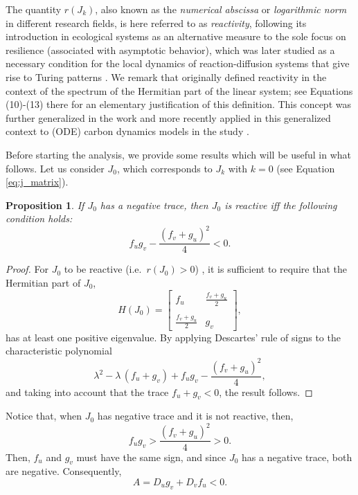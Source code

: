 \documentclass{article}
\newtheorem{proposition}{Proposition}
\newcommand{\jac}{J_{k}}
\begin{document}
 {The quantity $r(\jac)$, also known as the \textit{numerical abscissa} \cite{trefethen2005spectra} or \textit{logarithmic norm} \cite{moler2003nineteen} in different research fields, is here referred to as \textit{reactivity}, following its introduction in ecological systems \cite{neubert1997alternatives} as an alternative measure to the sole focus on resilience}
 (associated with asymptotic behavior), which was later studied as a necessary condition for the local dynamics of reaction-diffusion systems that give rise to Turing patterns \cite{NEUBERT2002}. {We remark that \cite{neubert1997alternatives} originally defined reactivity in the context of the spectrum of the Hermitian part of the linear system; see Equations (10)-(13) there for an elementary justification of this definition.} This concept was further generalized in the work \cite{mari2017generalized} and more recently applied in this generalized context to {(ODE)} carbon dynamics models in the study \cite{diele2023soc}.

Before starting the analysis, we provide some results 
 which will be useful in what follows. Let us consider $J_{0}$, which corresponds to $\jac$ with ${k} ={0}$ ({see Equation \ref{eq:j_matrix}}).
\begin{proposition}\label{prop:J*reactive} If \(J_{0} \) has a negative trace, then \( J_{0} \) is reactive iff the following condition holds:
\[
f_u g_v - \frac{(f_v + g_u)^2}{4} < 0.
\]
 \end{proposition}
 \begin{proof}
 For \( J_{0} \) to be reactive {(i.e.~$r(J_{0})>0$)} , it is sufficient to require that the Hermitian part of \( J_{0} \),
\[
H(J_{0}) = \left[ \begin{array}{cc}
         f_u & \frac{f_v + g_u}{2} \\\\
         \frac{f_v + g_u}{2} & g_v
    \end{array} \right],
\]
has at least one positive eigenvalue. By applying Descartes' rule of signs to the characteristic polynomial
\[
\lambda^2 - \lambda \, (f_u + g_v) + f_u g_v - \frac{(f_v + g_u)^2}{4},
\]
and taking into account that the trace \( f_u + g_v < 0 \), the result follows.
 \end{proof}
 Notice that, when  \( J_{0} \) has negative trace and it is  not reactive, then,
\[
f_u g_v > \frac{(f_v + g_u)^2}{4} > 0.
\]
Then, \( f_u \) and \( g_v \) must have the same sign, and since \( J_{0} \) has a negative trace, both are negative. Consequently,
\[
A = D_u g_v + D_v f_u < 0.
\]
\end{document}
